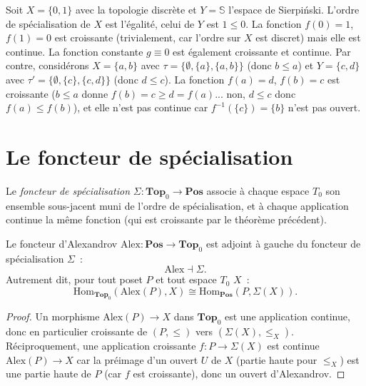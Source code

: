 \begin{exemple}
Soit $X = \{0,1\}$ avec la topologie discr\`ete et $Y = \mathbb{S}$ l'espace de
Sierpi\'nski. L'ordre de sp\'ecialisation de $X$ est l'\'egalit\'e, celui de $Y$ est
$1 \leq 0$. La fonction $f(0) = 1$, $f(1) = 0$ est croissante (trivialement, car
l'ordre sur $X$ est discret) mais elle est continue. La fonction constante $g \equiv 0$
est \'egalement croissante et continue. Par contre, consid\'erons $X = \{a,b\}$ avec
$\tau = \{\emptyset, \{a\}, \{a,b\}\}$ (donc $b \leq a$) et $Y = \{c,d\}$ avec
$\tau' = \{\emptyset, \{c\}, \{c,d\}\}$ (donc $d \leq c$). La fonction $f(a)=d$,
$f(b)=c$ est croissante ($b \leq a$ donne $f(b)=c \geq d = f(a)$... non, $d \leq c$
donc $f(a) \leq f(b)$), et elle n'est pas continue car $f^{-1}(\{c\}) = \{b\}$ n'est
pas ouvert.
\end{exemple}

\section{Le foncteur de sp\'ecialisation}

\begin{definition}
Le \emph{foncteur de sp\'ecialisation} $\Sigma\colon \mathbf{Top}_0 \to \mathbf{Pos}$
associe \`a chaque espace $T_0$ son ensemble sous-jacent muni de l'ordre de
sp\'ecialisation, et \`a chaque application continue la m\^eme fonction (qui est croissante
par le th\'eor\`eme pr\'ec\'edent).
\end{definition}

\begin{theoreme}
Le foncteur d'Alexandrov $\mathrm{Alex}\colon \mathbf{Pos} \to \mathbf{Top}_0$ est adjoint
\`a gauche du foncteur de sp\'ecialisation $\Sigma$~:
\[
  \mathrm{Alex} \dashv \Sigma.
\]
Autrement dit, pour tout poset $P$ et tout espace $T_0$ $X$~:
\[
  \mathrm{Hom}_{\mathbf{Top}_0}(\mathrm{Alex}(P), X) \cong
  \mathrm{Hom}_{\mathbf{Pos}}(P, \Sigma(X)).
\]
\end{theoreme}

\begin{proof}
Un morphisme $\mathrm{Alex}(P) \to X$ dans $\mathbf{Top}_0$ est une application continue,
donc en particulier croissante de $(P,\leq)$ vers $(\Sigma(X), \leq_X)$. R\'eciproquement,
une application croissante $f\colon P \to \Sigma(X)$ est continue $\mathrm{Alex}(P) \to X$
car la pr\'eimage d'un ouvert $U$ de $X$ (partie haute pour $\leq_X$) est une partie haute
de $P$ (car $f$ est croissante), donc un ouvert d'Alexandrov.
\end{proof}


